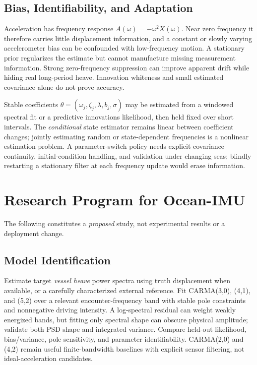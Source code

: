 \documentclass[10pt,journal]{IEEEtran}
\begin{document}
\subsection{Bias, Identifiability, and Adaptation}
Acceleration has frequency response
\(A(\omega)=-\omega^2 X(\omega)\). Near zero frequency it
therefore carries little displacement information, and a
constant or slowly varying accelerometer bias can be
confounded with low-frequency motion. A stationary prior
regularizes the estimate but cannot manufacture missing
measurement information. Strong zero-frequency suppression
can improve apparent drift while hiding real long-period
heave. Innovation whiteness and small estimated covariance
alone do not prove accuracy.

Stable coefficients \(\theta=(\omega_j,\zeta_j,\lambda,
b_j,\sigma)\) may be estimated from a windowed spectral fit
or a predictive innovations likelihood, then held fixed
over short intervals. The \emph{conditional} state estimator
remains linear between coefficient changes; jointly
estimating random or state-dependent frequencies is a
nonlinear estimation problem. A parameter-switch policy
needs explicit covariance continuity, initial-condition
handling, and validation under changing seas; blindly
restarting a stationary filter at each frequency update
would erase information.

\section{Research Program for Ocean-IMU}
The following constitutes a \emph{proposed} study, not
experimental results or a deployment change.

\subsection{Model Identification}
Estimate target \emph{vessel heave} power spectra using
truth displacement when available, or a carefully
characterized external reference. Fit CARMA(3,0), (4,1),
and (5,2) over a relevant encounter-frequency band with
stable pole constraints and nonnegative driving intensity.
A log-spectral residual can weight weakly energized bands,
but fitting only spectral shape can obscure physical
amplitude; validate both PSD shape and integrated variance.
Compare held-out likelihood, bias/variance, pole sensitivity,
and parameter identifiability. CARMA(2,0) and (4,2)
remain useful finite-bandwidth baselines with explicit
sensor filtering, not ideal-acceleration candidates.
\end{document}
